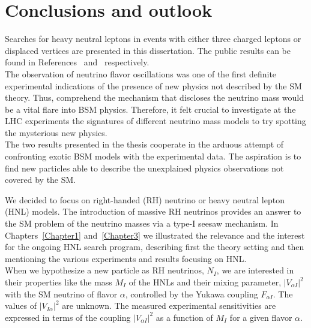 
\chapter{Conclusions and outlook}\label{Chapter7} 

Searches for heavy neutral leptons in events with either three
charged leptons or displaced vertices are presented in this dissertation. The public
results can be found in References~\cite{Sirunyan:2018mtv} and~\cite{CMS-PAS-EXO-20-009} respectively.\\


The observation of neutrino flavor oscillations was one of the first 
definite experimental indications of the
presence of new physics not described by the SM theory. Thus, 
comprehend the mechanism that discloses the neutrino mass would be a
vital flare into BSM physics. Therefore, it felt crucial to investigate at the LHC
experiments the signatures of different neutrino mass models
to try spotting the mysterious new physics.\\
The two results presented in the thesis cooperate in the arduous attempt of confronting exotic BSM
models with the experimental data. The aspiration is to find new
particles able to describe the unexplained
physics observations not covered by the SM. 

We decided to focus on right-handed (RH) neutrino or heavy neutral lepton (HNL)
models. The introduction of massive RH
neutrinos provides an answer to the SM problem of the
neutrino masses via a type-I seesaw mechanism.  
In Chapters~\ref{Chapter1} and~\ref{Chapter3} we illustrated
the relevance and the interest for the
ongoing HNL search program, describing first the theory setting 
and then mentioning the various experiments and results
focusing on HNL.\\
When we hypothesize a new particle as RH neutrinos, $N_{I}$, we
are interested in their properties like the mass $M_I$ of the HNLs and
their mixing parameter, $|V_{\alpha I}|^2$  with the SM neutrino of flavor $\alpha$,
controlled by the Yukawa coupling $F_{\alpha I}$. The values of $|V_{I
  \alpha}|^2$ are unknown. The measured experimental
sensitivities are expressed in
terms of the coupling $|V_{\alpha I}|^2$
as a function of $M_I$ for a given flavor $\alpha$. 

